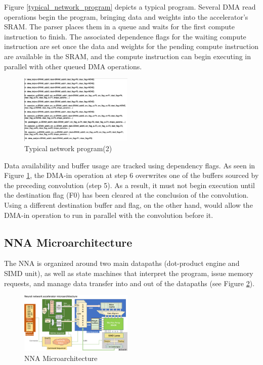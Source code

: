 \documentclass[letterpaper, 10 pt, conference]{ieeeconf}  %
\begin{document}
Figure \ref{typical_network_program} depicts a typical program. Several DMA read operations begin the program, bringing data and weights into the accelerator's SRAM. The parser places them in a queue and waits for the first compute instruction to finish. The associated dependence flags for the waiting compute instruction are set once the data and weights for the pending compute instruction are available in the SRAM, and the compute instruction can begin executing in parallel with other queued DMA operations.

\begin{figure}[hbt!]
\centering
\includegraphics[width=0.48\textwidth]{gfx/DMA_procedure.png}
\caption{Typical network program(2)}
\label{typical_network_program_2}
\end{figure}

Data availability and buffer usage are tracked using dependency flags. As seen in Figure \ref{typical_network_program_2}, the DMA-in operation at step 6 overwrites one of the buffers sourced by the preceding convolution (step 5). As a result, it must not begin execution until the destination flag (F0) has been cleared at the conclusion of the convolution. Using a different destination buffer and flag, on the other hand, would allow the DMA-in operation to run in parallel with the convolution before it.

\subsection{NNA Microarchitecture}
The NNA is organized around two main datapaths (dot-product engine and SIMD unit), as well as state machines that interpret the program, issue memory requests, and manage data transfer into and out of the datapaths (see Figure \ref{NNA_Microarchitecture}).

\begin{figure}[hbt!]
\centering
\includegraphics[width=0.48\textwidth]{gfx/nna_microarchitecture.png}
\caption{NNA Microarchitecture}
\label{NNA_Microarchitecture}
\end{figure}
\end{document}
